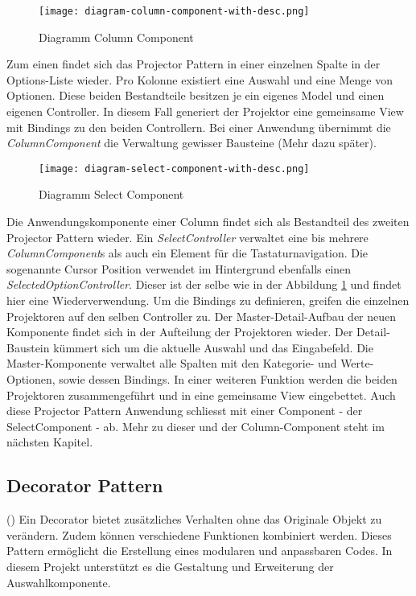 \begin{figure}[!htb]
    \centering
    \texttt{[image: diagram-column-component-with-desc.png]}
    \caption{Diagramm Column Component}
    \label{img:DiagramColumnComponent}
\end{figure}

Zum einen findet sich das Projector Pattern in einer einzelnen Spalte in der Options-Liste wieder.
Pro Kolonne existiert eine Auswahl und eine Menge von Optionen.
Diese beiden Bestandteile besitzen je ein eigenes Model und einen eigenen Controller.
In diesem Fall generiert der Projektor eine gemeinsame View mit Bindings zu den beiden Controllern.
Bei einer Anwendung übernimmt die \emph{ColumnComponent} die Verwaltung gewisser Bausteine (Mehr dazu später).

\begin{figure}[!htb]
    \centering
    \texttt{[image: diagram-select-component-with-desc.png]}
    \caption{Diagramm Select Component}
    \label{img:DiagramSelectComponent}
\end{figure}

Die Anwendungskomponente einer Column findet sich als Bestandteil des zweiten Projector Pattern wieder.
Ein \emph{SelectController} verwaltet eine bis mehrere \emph{ColumnComponent}s als auch ein Element für die Tastaturnavigation.
Die sogenannte Cursor Position verwendet im Hintergrund ebenfalls einen \emph{SelectedOptionController}. 
Dieser ist der selbe wie in der Abbildung \ref{img:DiagramColumnComponent} und findet hier eine Wiederverwendung.
Um die Bindings zu definieren, greifen die einzelnen Projektoren auf den selben Controller zu.
Der Master-Detail-Aufbau der neuen Komponente findet sich in der Aufteilung der Projektoren wieder.
Der Detail-Baustein kümmert sich um die aktuelle Auswahl und das Eingabefeld.
Die Master-Komponente verwaltet alle Spalten mit den Kategorie- und Werte-Optionen, sowie dessen Bindings.
In einer weiteren Funktion werden die beiden Projektoren zusammengeführt und in eine gemeinsame View eingebettet.
Auch diese Projector Pattern Anwendung schliesst mit einer Component - der SelectComponent - ab.
Mehr zu dieser und der Column-Component steht im nächsten Kapitel.


\subsection{Decorator Pattern}
\label{sec:decoratorPattern}

(\cite{decoratorPattern}) Ein Decorator bietet zusätzliches Verhalten ohne das Originale Objekt zu verändern.
Zudem können verschiedene Funktionen kombiniert werden.
Dieses Pattern ermöglicht die Erstellung eines modularen und anpassbaren Codes.
In diesem Projekt unterstützt es die Gestaltung und Erweiterung der Auswahlkomponente.

